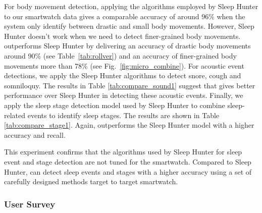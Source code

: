 For body movement detection, applying the algorithms employed by Sleep Hunter to our smartwatch data gives a comparable accuracy of around 96\% when the system only identify between drastic and small body movements. However, Sleep Hunter doesn't work when we need to detect finer-grained body movements.  {\systemname} outperforms Sleep Hunter by delivering an accuracy of drastic body movements around 90\% (see Table~\ref{tab:rollver}) and an accuracy of finer-grained body movements more than 78\% (see Fig.~\ref{fig:micro_combine}). For acoustic event detections, we apply the Sleep Hunter algorithms to detect snore, cough and somniloquy. The results in Table \ref{tab:compare_sound1} suggest that {\systemname} gives better performance over Sleep Hunter in detecting these acoustic events. Finally, we apply the sleep stage detection model used by Sleep Hunter to combine sleep-related events to identify sleep stages. The results are shown in Table \ref{tab:compare_stage1}. Again,  {\systemname} outperforms the Sleep Hunter model with a higher accuracy and recall.


This experiment confirms that the algorithms used by Sleep Hunter for sleep event and stage detection are not tuned for the smartwatch. Compared to Sleep Hunter, {\systemname} can detect sleep events and stages with a higher accuracy using a set of carefully designed methods target to target smartwatch.


\subsubsection{User Survey}\label{sec:user_survey}

